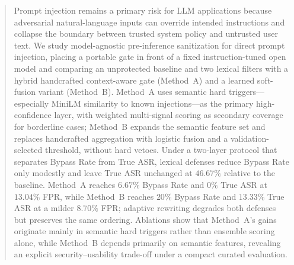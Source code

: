 
\begin{abstract}
Prompt injection remains a primary risk for LLM applications because adversarial natural-language inputs can override intended instructions and collapse the boundary between trusted system policy and untrusted user text.
We study model-agnostic pre-inference sanitization for direct prompt injection, placing a portable gate in front of a fixed instruction-tuned open model and comparing an unprotected baseline and two lexical filters with a hybrid handcrafted context-aware gate (Method~A) and a learned soft-fusion variant (Method~B).
Method~A uses semantic hard triggers---especially MiniLM similarity to known injections---as the primary high-confidence layer, with weighted multi-signal scoring as secondary coverage for borderline cases; Method~B expands the semantic feature set and replaces handcrafted aggregation with logistic fusion and a validation-selected threshold, without hard vetoes.
Under a two-layer protocol that separates Bypass Rate from True ASR, lexical defenses reduce Bypass Rate only modestly and leave True ASR unchanged at \(46.67\%\) relative to the baseline.
Method~A reaches \(6.67\%\) Bypass Rate and \(0\%\) True ASR at \(13.04\%\) FPR, while Method~B reaches \(20\%\) Bypass Rate and \(13.33\%\) True ASR at a milder \(8.70\%\) FPR; adaptive rewriting degrades both defenses but preserves the same ordering.
Ablations show that Method~A's gains originate mainly in semantic hard triggers rather than ensemble scoring alone, while Method~B depends primarily on semantic features, revealing an explicit security--usability trade-off under a compact curated evaluation.
\end{abstract}


